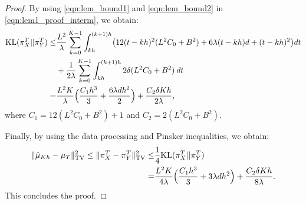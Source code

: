 \begin{proof}
By using \eqref{eqn:lem_bound1} and \eqref{eqn:lem_bound2} in \eqref{eqn:lem1_proof_interm}, we obtain:
\begin{align}
\nonumber \textnormal{KL} (\pi_{X}^T || \pi_{Y}^T) \leq& \frac{L^2}{\lambda} \sum_{k=0}^{K-1} \int_{kh}^{(k+1)h} \bigl(12(t-kh)^2 (L^2 C_0 + B^2) + 6\lambda (t-kh)d +(t-kh)^2 \bigr) dt\\
&+  \frac1{2 \lambda} \sum_{k=0}^{K-1} \int_{kh}^{(k+1)h} 2 \delta(L^2 C_0 + B^2) \> dt \\
=& \frac{L^2 K}{\lambda} \Bigl( \frac{C_1 h^3}{3} + \frac{6 \lambda d h^2}{2} \Bigr) + \frac{C_2 \delta K h}{2\lambda},
\end{align}
where $C_1 = 12(L^2 C_0 + B^2)+1$ and $C_2 = 2 (L^2 C_0 + B^2)$.

Finally, by using the data processing and Pinsker inequalities, we obtain:
\begin{align}
\| \hat{\mu}_{Kh} - \mu_{T} \|_{\textnormal{TV}}^2 \leq \| \pi_{X}^T - \pi_{Y}^T \|_{\textnormal{TV}}^2 \leq& \frac1{4} \textnormal{KL} (\pi_{X}^T || \pi_{Y}^T) \\
=& \frac{L^2 K}{4\lambda} \Bigl( \frac{C_1 h^3}{3} + 3 \lambda d h^2 \Bigr) + \frac{C_2 \delta K h}{8\lambda}.
\end{align}
This concludes the proof.
%
\end{proof}


